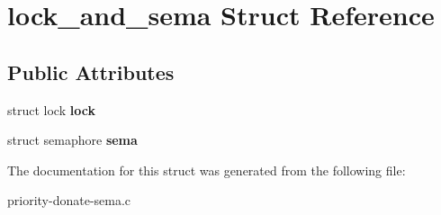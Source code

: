 \hypertarget{structlock__and__sema}{}\section{lock\+\_\+and\+\_\+sema Struct Reference}
\label{structlock__and__sema}
\subsection*{Public Attributes}
\begin{DoxyCompactItemize}
\item 
struct lock {\bfseries lock}\hypertarget{structlock__and__sema_acd539b4efc9ddde7d5b0db5728169363}{}\label{structlock__and__sema_acd539b4efc9ddde7d5b0db5728169363}

\item 
struct semaphore {\bfseries sema}\hypertarget{structlock__and__sema_a57217f98db5160dc9def53ae479a18dd}{}\label{structlock__and__sema_a57217f98db5160dc9def53ae479a18dd}

\end{DoxyCompactItemize}


The documentation for this struct was generated from the following file\+:\begin{DoxyCompactItemize}
\item 
priority-\/donate-\/sema.\+c\end{DoxyCompactItemize}
